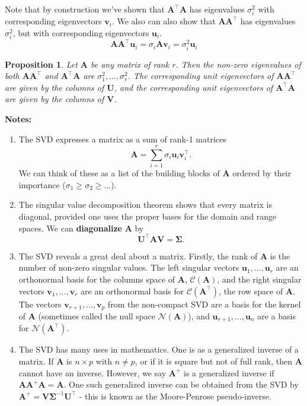 \documentclass[
]{book}
\newtheorem{proposition}{Proposition}[chapter]
\theoremstyle{definition}
\theoremstyle{definition}
\theoremstyle{definition}
\theoremstyle{definition}
\theoremstyle{remark}
\begin{document}
Note that by construction we've shown that \(\mathbf A^\top\mathbf A\) has eigenvalues \(\sigma^2_i\) with corresponding eigenvectors \(\mathbf v_i\). We also can also show that \(\mathbf A\mathbf A^\top\) has eigenvalues \(\sigma^2_i\), but with corresponding eigenvectors \(\mathbf u_i\).
\[\mathbf A\mathbf A^\top \mathbf u_i = \sigma_i\mathbf A\mathbf v_i = \sigma^2_i \mathbf u_i\]

\begin{proposition}
\protect\hypertarget{prp:SVDeigen}{}\label{prp:SVDeigen}Let \(\mathbf A\) be any matrix of rank \(r\). Then the non-zero eigenvalues of both \(\mathbf A\mathbf A^\top\) and \(\mathbf A^\top \mathbf A\) are \(\sigma_1^2, \ldots , \sigma_r^2\). The corresponding unit eigenvectors of \(\mathbf A\mathbf A^\top\) are given by the columns of \(\mathbf U\), and the corresponding unit eigenvectors of \(\mathbf A^\top \mathbf A\) are given by the columns of \(\mathbf V\).
\end{proposition}

\textbf{Notes:}

\begin{enumerate}
\def\labelenumi{\arabic{enumi}.}
\item
  The SVD expresses a matrix as a sum of rank-1 matrices
  \[\mathbf A= \sum_{i=1}^r \sigma_i \mathbf u_i \mathbf v_i^\top.\]
  We can think of these as a list of the building blocks of \(\mathbf A\) ordered by their importance (\(\sigma_1\geq \sigma_2\geq\ldots\)).
\item
  The singular value decomposition theorem shows that every matrix is diagonal, provided one uses the proper bases for the domain and range spaces. We can \textbf{diagonalize} \(\mathbf A\) by
  \[ \mathbf U^\top\mathbf A\mathbf V=\boldsymbol{\Sigma}.\]
\item
  The SVD reveals a great deal about a matrix. Firstly, the rank of \(\mathbf A\) is the number of non-zero singular values. The left singular vectors \(\mathbf u_1, \ldots, \mathbf u_r\) are an orthonormal basis for the columns space of \(\mathbf A\), \(\mathcal{C}(\mathbf A)\), and the right singular vectors \(\mathbf v_1, \ldots, \mathbf v_r\) are an orthonormal basis for \(\mathcal{C}(\mathbf A^\top)\), the row space of \(\mathbf A\). The vectors \(\mathbf v_{r+1}, \ldots, \mathbf v_p\) from the non-compact SVD are a basis for the kernel of \(\mathbf A\) (sometimes called the null space \(\mathcal{N}(\mathbf A)\)), and \(\mathbf u_{r+1}, \ldots, \mathbf u_n\) are a basis for \(\mathcal{N}(\mathbf A^\top)\).
\item
  The SVD has many uses in mathematics. One is as a generalized inverse of a matrix. If \(\mathbf A\) is \(n \times p\) with \(n\not = p\), or if it is square but not of full rank, then \(\mathbf A\) cannot have an inverse. However, we say \(\mathbf A^+\) is a generalized inverse if \(\mathbf A\mathbf A^+\mathbf A=\mathbf A\). One such generalized inverse can be obtained from the SVD by \(\mathbf A^+ = \mathbf V\boldsymbol{\Sigma}^{-1}\mathbf U^\top\) - this is known as the Moore-Penrose pseudo-inverse.
\end{enumerate}
\end{document}
